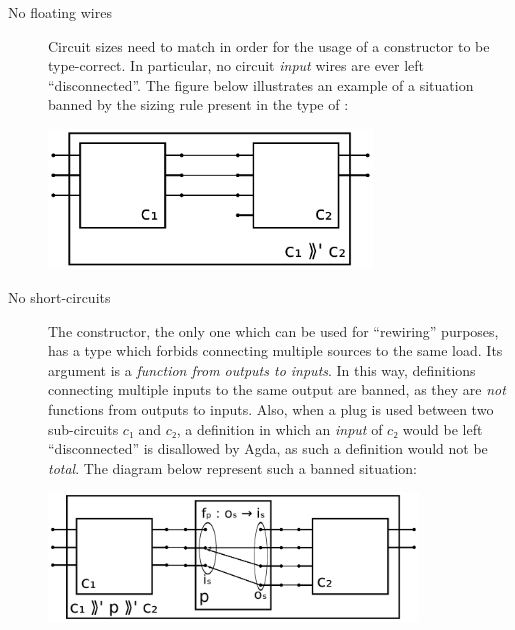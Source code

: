             \begin{description}
                \item[No floating wires] Circuit sizes need to match in order for the usage of a constructor
                    to be type-correct. In particular, no circuit \emph{input} wires are ever left ``disconnected''.
                    The figure below illustrates an example of a situation banned by the sizing rule present
                    in the type of :

                    \includegraphics[width=0.7\textwidth]{imgs/sequencing-floating.pdf}

                \item [No short-circuits] The  constructor, the only one which can be used for
                    ``rewiring'' purposes, has a type which forbids connecting multiple sources to the same load.
                    Its argument is a \emph{function from outputs to inputs}.
                    In this way, definitions connecting multiple inputs to the same output are banned,
                    as they are \emph{not} functions from outputs to inputs.
                    Also, when a plug is used between two sub-circuits $c₁$ and $c₂$,
                    a definition in which an \emph{input} of $c₂$ would be left ``disconnected'' is disallowed by Agda,
                    as such a definition would not be \emph{total}.
                    The diagram below represent such a banned situation:

                    \includegraphics[width=0.8\textwidth]{imgs/plug-seq-disconnected-input.pdf}
            \end{description}




